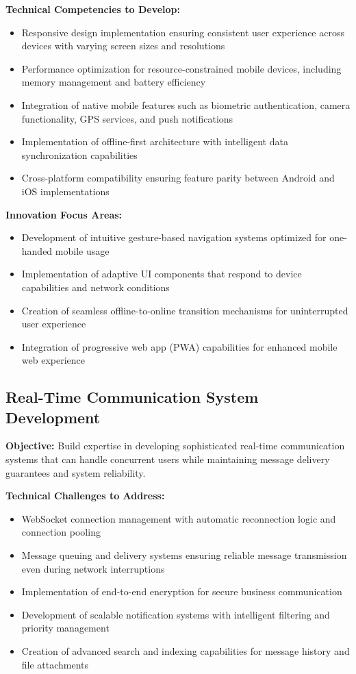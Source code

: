 \textbf{Technical Competencies to Develop:}
\begin{itemize}
    \item Responsive design implementation ensuring consistent user experience across devices with varying screen sizes and resolutions
    \item Performance optimization for resource-constrained mobile devices, including memory management and battery efficiency
    \item Integration of native mobile features such as biometric authentication, camera functionality, GPS services, and push notifications
    \item Implementation of offline-first architecture with intelligent data synchronization capabilities
    \item Cross-platform compatibility ensuring feature parity between Android and iOS implementations
\end{itemize}

\textbf{Innovation Focus Areas:}
\begin{itemize}
    \item Development of intuitive gesture-based navigation systems optimized for one-handed mobile usage
    \item Implementation of adaptive UI components that respond to device capabilities and network conditions
    \item Creation of seamless offline-to-online transition mechanisms for uninterrupted user experience
    \item Integration of progressive web app (PWA) capabilities for enhanced mobile web experience
\end{itemize}

\subsection{Real-Time Communication System Development}

\textbf{Objective:} Build expertise in developing sophisticated real-time communication systems that can handle concurrent users while maintaining message delivery guarantees and system reliability.

\textbf{Technical Challenges to Address:}
\begin{itemize}
    \item WebSocket connection management with automatic reconnection logic and connection pooling
    \item Message queuing and delivery systems ensuring reliable message transmission even during network interruptions
    \item Implementation of end-to-end encryption for secure business communication
    \item Development of scalable notification systems with intelligent filtering and priority management
    \item Creation of advanced search and indexing capabilities for message history and file attachments
\end{itemize}

